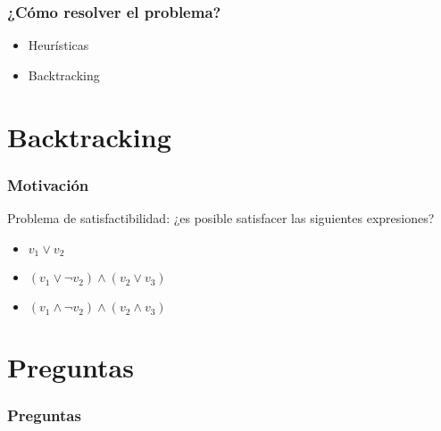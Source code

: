 \documentclass{beamer}
\begin{document}
\frame
{
  \frametitle{¿Cómo resolver el problema?}

  \begin{itemize}
  \item Heurísticas
  \item Backtracking
  \end{itemize}
}

\section{Backtracking}

\frame
{
  \frametitle{Motivación}

  Problema de satisfactibilidad: ¿es posible satisfacer las siguientes expresiones?

  \begin{itemize}
  \item $v_1 \vee v_2$
  \item $(v_1 \vee \neg v_2) \wedge (v_2 \vee v_3)$
  \item $(v_1 \wedge \neg v_2) \wedge (v_2 \wedge v_3)$
  \end{itemize}
}

\section{Preguntas}

\frame
{
  \frametitle{Preguntas}
}
\end{document}
